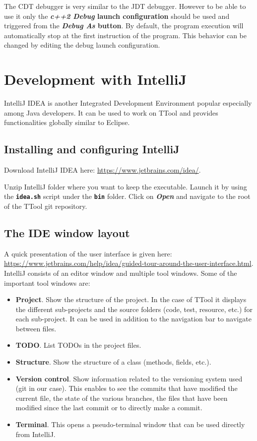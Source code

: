\documentclass[12pt]{article}
\begin{document}
The CDT debugger is very similar to the JDT debugger. However to be able to use
it only the \textbf{\textit{c++2 Debug} launch configuration} should be used and
triggered from the \textbf{\textit{Debug As} button}. By default, the program execution
will automatically stop at the first instruction of the program. This behavior
can be changed by editing the debug launch configuration.

\newpage

\section{Development with IntelliJ}

IntelliJ IDEA is another Integrated Development Environment popular especially
among Java developers. It can be used to work on TTool and provides
functionalities globally similar to Eclipse.

\subsection{Installing and configuring IntelliJ}

Download IntelliJ IDEA here: \url{https://www.jetbrains.com/idea/}.

Unzip IntelliJ folder where you want to keep the executable. Launch it by using
the \textbf{\texttt{idea.sh}} script under the \textbf{\texttt{bin}} folder. Click on \textbf{\emph{Open}}
and navigate to the root of the TTool git repository.

\subsection{The IDE window layout}

A quick presentation of the user interface is given here:
\url{https://www.jetbrains.com/help/idea/guided-tour-around-the-user-interface.html}.
IntelliJ consists of an editor window and multiple tool windows. Some of the
important tool windows are:
\begin{itemize}
    \item \textbf{Project}. Show the structure of the project. In the case of
        TTool it displays the different sub-projects and the source folders
        (code, test, resource, etc.) for each sub-project. It can be used in
        addition to the navigation bar to navigate between files.
    \item \textbf{TODO}. List TODOs in the project files.
    \item \textbf{Structure}. Show the structure of a class (methods, fields,
        etc.).
    \item \textbf{Version control}. Show information related to the versioning
        system used (git in our case). This enables to see the commits that have
        modified the current file, the state of the various branches, the files
        that have been modified since the last commit or to directly make a
        commit.
    \item \textbf{Terminal}. This opens a pseudo-terminal window that can be
        used directly from IntelliJ.
\end{itemize}
\end{document}
